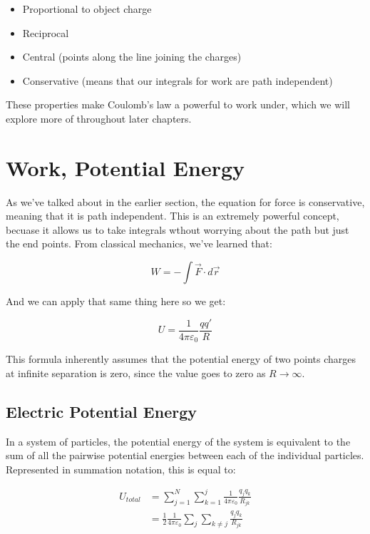 \documentclass{report}
\theoremstyle{definition}
\numberwithin{equation}{section}
\numberwithin{definition}{section}
\begin{document}
    \begin{itemize}
        \item Proportional to object charge
        \item Reciprocal
        \item Central (points along the line joining the charges)
        \item Conservative (means that our integrals for work are path independent)
    \end{itemize}

    These properties make Coulomb's law a powerful  to work under, which we will explore more of throughout later chapters. 

    \section{Work, Potential Energy}

    As we've talked about in the earlier section, the equation for force is conservative, meaning that it is path independent. This is an extremely powerful concept, becuase it allows us to take integrals wthout worrying about the path but just the end points. From classical mechanics, we've learned that:

    \[ W = -\int \vec{F} \cdot d\vec{r}\]

    And we can apply that same thing here so we get:

    \[ U = \frac{1}{4\pi\varepsilon_0} \frac{qq'}{R}\]

    This formula inherently assumes that the potential energy of two points charges at infinite separation is zero, since the value goes to zero as $R \to \infty$. 

    \subsection{Electric Potential Energy}

    In a system of particles, the potential energy of the system is equivalent to the sum of all the pairwise potential energies between each of the individual particles. Represented in summation notation, this is equal to:

    \begin{theorem}
    \begin{align*}
        U_{total} &= \sum_{j = 1}^N \sum_{k = 1}^j \frac{1}{4\pi\varepsilon_0} \frac{q_jq_k}{R_{jk}}\\
        &= \frac{1}{2} \frac{1}{4\pi\varepsilon_0} \sum_j \sum_{k \neq j} \frac{q_jq_k}{R_{jk}}
    \end{align*}
    \end{theorem}
\end{document}
